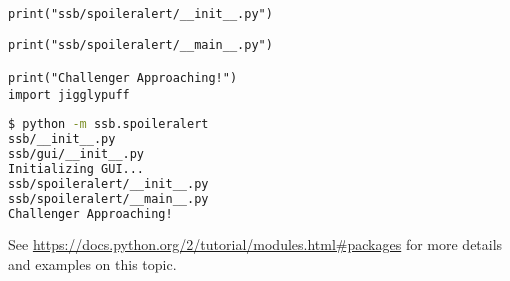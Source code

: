 \begin{lstlisting}
print("ssb/spoileralert/__init__.py")
\end{lstlisting}

\begin{lstlisting}
print("ssb/spoileralert/__main__.py")

print("Challenger Approaching!")
import jigglypuff
\end{lstlisting}

\begin{lstlisting}[language=bash]
$ python -m ssb.spoileralert
ssb/__init__.py
ssb/gui/__init__.py
Initializing GUI...
ssb/spoileralert/__init__.py
ssb/spoileralert/__main__.py
Challenger Approaching!
\end{lstlisting}

See \url{https://docs.python.org/2/tutorial/modules.html\#packages} for more details and examples on this topic.

